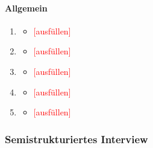\documentclass[../Main.tex]{subfiles}
\begin{document}
\paragraph{Allgemein}
\begin{enumerate}[label=\textbf{B\arabic*}, leftmargin=1.5cm, itemsep=0.8em, resume]
    \item
        \begin{itemize}[nosep]
            \item \textcolor{red}{[ausfüllen]}
        \end{itemize}
    \item
        \begin{itemize}[nosep]
            \item \textcolor{red}{[ausfüllen]}
        \end{itemize}
    \item
        \begin{itemize}[nosep]
            \item \textcolor{red}{[ausfüllen]}
        \end{itemize}
    \item
        \begin{itemize}[nosep]
            \item \textcolor{red}{[ausfüllen]}
        \end{itemize}
    \item
        \begin{itemize}[nosep]
            \item \textcolor{red}{[ausfüllen]}
        \end{itemize}
\end{enumerate}

\subsubsection{Semistrukturiertes Interview}
\end{document}
